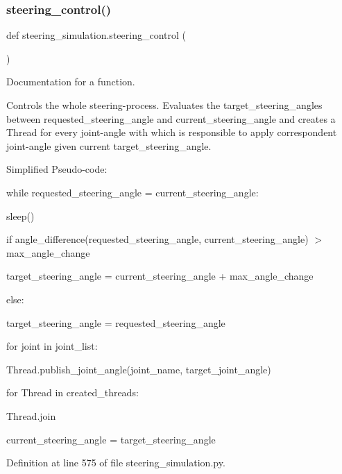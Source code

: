 \subsubsection{\texorpdfstring{steering\_control()}{steering\_control()}}
{\footnotesize\ttfamily def steering\+\_\+simulation.\+steering\+\_\+control (\begin{DoxyParamCaption}{ }\end{DoxyParamCaption})}



Documentation for a function. 

Controls the whole steering-\/process. Evaluates the target\+\_\+steering\+\_\+angles between requested\+\_\+steering\+\_\+angle and current\+\_\+steering\+\_\+angle and creates a Thread for every joint-\/angle with which is responsible to apply correspondent joint-\/angle given current target\+\_\+steering\+\_\+angle.

Simplified Pseudo-\/code\+:

while requested\+\_\+steering\+\_\+angle = current\+\_\+steering\+\_\+angle\+: \begin{DoxyVerb}sleep()
\end{DoxyVerb}


if angle\+\_\+difference(requested\+\_\+steering\+\_\+angle, current\+\_\+steering\+\_\+angle) $>$ max\+\_\+angle\+\_\+change \begin{DoxyVerb}target_steering_angle = current_steering_angle + max_angle_change
\end{DoxyVerb}


else\+: \begin{DoxyVerb}target_steering_angle = requested_steering_angle
\end{DoxyVerb}


for joint in joint\+\_\+list\+: \begin{DoxyVerb}Thread.publish_joint_angle(joint_name, target_joint_angle)
\end{DoxyVerb}


for Thread in created\+\_\+threads\+: \begin{DoxyVerb}    Thread.join
\end{DoxyVerb}


current\+\_\+steering\+\_\+angle = target\+\_\+steering\+\_\+angle 

Definition at line 575 of file steering\+\_\+simulation.\+py.


